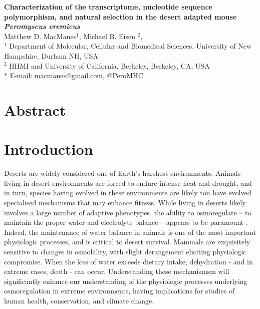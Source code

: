 \documentclass[11pt]{article}
\date{}
\begin{document}
\begin{flushleft}
{\Large
\textbf{Characterization of the transcriptome, nucleotide sequence polymorphism, and natural selection in the desert adapted mouse \textit{Peromyscus eremicus}}
}
\\
Matthew D. MacManes$^{1}$, 
Michael B. Eisen $^{2}$, 
\\
$^{1}$ Department of Molecular, Cellular and Biomedical Sciences, University of New Hampshire, Durham NH, USA
\\
$^{2}$ HHMI and University of California, Berkeley, Berkeley, CA, USA
\\
$\ast$ E-mail: macmanes@gmail.com, @PeroMHC
\end{flushleft}

\linenumbers

\section*{Abstract}



\section*{Introduction}

Deserts are widely considered one of Earth's harshest environments. Animals living in desert environments are forced to endure intense heat and drought, and in turn, species having evolved in these environments are likely ton have evolved specialised mechanisms that may enhance fitness. While living in deserts likely involves a large number of adaptive phenotypes, the ability to osmoregulate -- to maintain the proper water and electrolyte balance -- appears to be paramount \cite{Walsberg:2000uu}. Indeed, the maintenance of water balance in animals is one of the most important physiologic processes, and is critical to desert survival. Mammals are exquisitely sensitive to changes in osmolality, with slight derangement eliciting physiologic compromise.  When the loss of water exceeds dietary intake, dehydration - and in extreme cases, death - can occur. Understanding these mechanismsm will significantly enhance our understanding of the physiologic processes underlying osmoregulation in extreme environments, having implications for studies of human health, conservation, and climate change. \\
\end{document}

